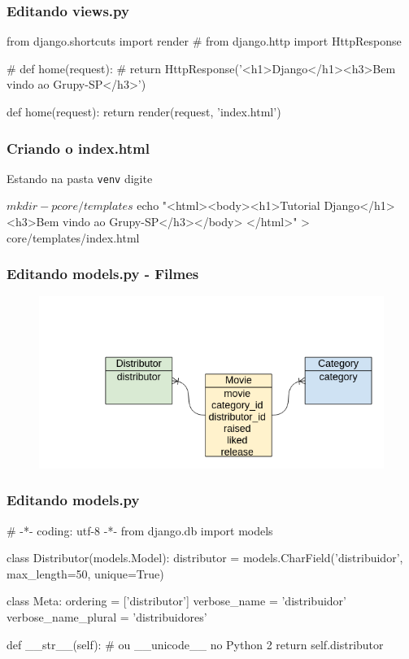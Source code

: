 \documentclass[aspectratio=169]{beamer}
\begin{document}
\begin{frame}[fragile]\frametitle{Editando views.py}

\begin{pythoncode}
	from django.shortcuts import render
	# from django.http import HttpResponse

	# def home(request):
	#     return HttpResponse('<h1>Django</h1><h3>Bem vindo ao Grupy-SP</h3>')

	def home(request):
	    return render(request, 'index.html')
\end{pythoncode}

\end{frame}

\begin{frame}[fragile]\frametitle{Criando o index.html}

Estando na pasta \texttt{venv} digite

\begin{bashcode}
	$ mkdir -p core/templates
	$ echo "<html><body><h1>Tutorial Django</h1>
	        <h3>Bem vindo ao Grupy-SP</h3></body>
	        </html>" > core/templates/index.html
\end{bashcode}


\end{frame}

\begin{frame}[fragile]\frametitle{Editando models.py - Filmes}

	\begin{figure}[h]
	  \centering
  		\includegraphics[width=.8\paperwidth]{img/diagram.png}
	\end{figure}

\end{frame}


\begin{frame}[fragile]\frametitle{Editando models.py}

\begin{pythoncode}
	# -*- coding: utf-8 -*-
	from django.db import models

	class Distributor(models.Model):
	    distributor = models.CharField('distribuidor',
	                                   max_length=50, unique=True)

	    class Meta:
	        ordering = ['distributor']
	        verbose_name = 'distribuidor'
	        verbose_name_plural = 'distribuidores'

	    def __str__(self): # ou __unicode__ no Python 2
	        return self.distributor
\end{pythoncode}

\end{frame}
\end{document}
